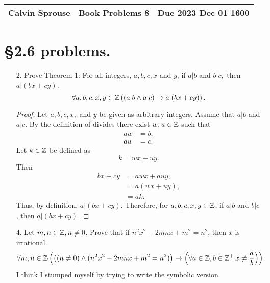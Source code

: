 \documentclass[a4paper, 12pt]{../../config/homework}
\begin{document}
\noindent
\begin{tabularx}{\textwidth}{>{\centering\arraybackslash}X>{\centering\arraybackslash}X>{\centering\arraybackslash}X}
Calvin Sprouse & Book Problems 8 & Due 2023 Dec 01 1600\\
\midrule
\end{tabularx}

\section*{\S 2.6 problems.}
\begin{enumerate}
\item[2.] Prove Theorem 1: For all integers, $a, b, c, x$ and $y$, if $a|b$ and $b|c,$ then $a|(bx+cy)$.
\[\forall a, b, c, x, y\in\mathbb{Z}\left(\left(a|b\land a|c\right) \rightarrow a|(bx+cy)\right).\]
\begin{proof}
Let $a, b, c, x,$ and $y$ be given as arbitrary integers. Assume that $a|b$ and $a|c$. By the definition of divides there exist $w,u\in\mathbb{Z}$ such that
\begin{align*}
aw &= b,\\
au &= c.
\end{align*}
Let $k\in\mathbb{Z}$ be defined as
\[k=wx+uy.\]
Then
\begin{align*}
    bx+cy &= awx + auy,
    \\&= a(wx+uy),
    \\&= ak.
\end{align*}
Thus, by definition, $a|(bx+cy)$. Therefore, for $a, b, c, x, y\in\mathbb{Z}$, if $a|b$ and $b|c$, then $a|(bx+cy)$.
\end{proof}

\item[4.] Let $m,n\in\mathbb{Z}, n\neq0$. Prove that if $n^2x^2-2mnx+m^2=n^2$, then $x$ is irrational.
\[\forall m,n\in\mathbb{Z}\left(\left((n\neq0) \land (n^2x^2-2mnx+m^2=n^2)\right) \rightarrow \left(\forall a\in\mathbb{Z},b\in\mathbb{Z}^+\,x\neq\frac{a}{b}\right)\right).\]
I think I stumped myself by trying to write the symbolic version.


\end{enumerate}
\end{document}

